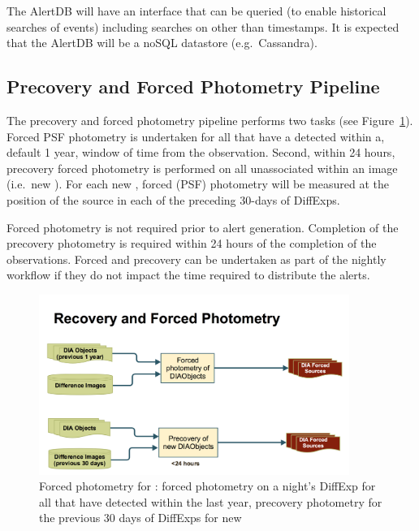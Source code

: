 The AlertDB will have an interface that can be queried (to enable historical searches of events) including searches on other than timestamps. It is expected that the AlertDB will be a noSQL datastore (e.g.\ Cassandra).






\clearpage

\subsection{Precovery and Forced Photometry Pipeline}

The precovery and forced photometry  pipeline performs two tasks (see Figure~\ref{fig:apForcedPrecovery}). Forced PSF photometry is undertaken for all \DIAObjects that have a detected \DIASource within a, default 1 year, window of time from the observation.  Second, within 24 hours, precovery forced photometry is performed on all unassociated \DIASources within an image (i.e.\ new \DIAObjects). For each new \DIAObject, forced (PSF) photometry will be measured at the position of the source in each of the preceding  30-days of DiffExps.

Forced photometry is not required prior to alert generation. Completion of the precovery photometry is required within 24 hours of the completion of the observations. Forced and precovery can be undertaken as part of the nightly workflow if they do not impact the time required to distribute the alerts.

\begin{figure}[th]
\begin{center}
\includegraphics[width=0.9\textwidth]{figures/Forced_Precovery.png}
\caption{\label{fig:apForcedPrecovery} Forced photometry for \DIAObjects: forced photometry on a night's DiffExp for all \DIAObjects that have detected \DIASources within the last year, precovery photometry for the previous 30 days of DiffExps for new \DIAObjects}
\end{center}
\end{figure}


